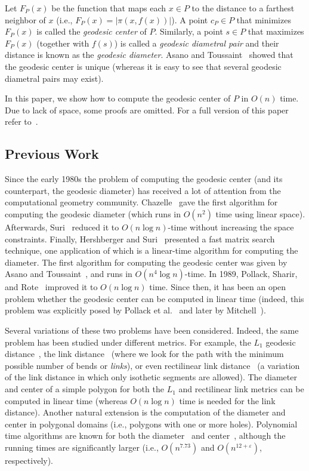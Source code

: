 \documentclass[a4paper,UKenglish]{lipics}
\newcommand{\F}[2]{\ensuremath{F_{\scriptscriptstyle #1}(#2)}}
\newcommand{\ff}[1]{\ensuremath{f(#1)}}
\newcommand{\cp}{\ensuremath{c_P}}
\newcommand{\g}[2]{\ensuremath{|\pi(#1, #2)|}}
\begin{document}
Let $\F{P}{x}$ be the function that maps each $x\in P$ to the distance to a farthest neighbor of $x$ (i.e., $\F{P}{x} = \g{x}{\ff{x}}$).
A point $\cp\in P$ that minimizes $\F{P}{x}$ is called the \emph{geodesic center} of $P$. Similarly, a point $s\in P$ that maximizes $\F{P}{x}$ (together with $\ff{s}$) is called a \emph{geodesic diametral pair} and their distance is known as the \emph{geodesic diameter}. Asano and Toussaint~\cite{at-cgcsp-85} showed that the geodesic center is unique (whereas it is easy to see that several geodesic diametral pairs may exist).

In this paper, we show how to compute the geodesic center of $P$ in $O(n)$ time. Due to lack of space, some proofs are omitted. For a full version of this paper refer to~\cite{ArXivGeodesicCenter}.

\subsection{Previous Work}
Since the early 1980s the problem of computing the geodesic center (and its counterpart, the geodesic diameter) has received a lot of attention from the computational geometry community. Chazelle~\cite{c-tpca-82} gave the first algorithm for computing the geodesic diameter (which runs in $O(n^2)$ time using linear space). Afterwards, Suri~\cite{suri1989computing} reduced it to $O(n\log n)$-time without increasing the space constraints. Finally, Hershberger and Suri~\cite{hershberger1993matrix} presented a fast matrix search technique, one application of which is a linear-time algorithm for computing the diameter.
The first algorithm for computing the geodesic center was given by Asano and Toussaint~\cite{at-cgcsp-85}, and runs in $O(n^4\log n)$-time. In 1989, Pollack, Sharir, and Rote~\cite{pollackComputingCenter} improved it to $O(n\log n)$ time. Since then, it has been an open problem whether the geodesic center can be
computed in linear time (indeed, this problem was explicitly posed by Pollack et al.~\cite{pollackComputingCenter} and later by Mitchell~\cite[Chapter 27]{m-gspno-00}).

Several variations of these two problems have been considered. Indeed, the same problem has been studied under different metrics. For example, the $L_1$ geodesic distance~\cite{bkow-clgdcsplt-13},  the link distance~\cite{dls-aclcsp-92,k-ealdp-89,suri-mlpprp-87} (where we look for the path with the minimum possible number of bends or {\em links}), or even rectilinear link distance~\cite{ns-crldp-91,ns-oarlcrp-96} (a variation of the link distance in which only isothetic segments are allowed). The diameter and center of a simple polygon for both the $L_1$ and rectilinear link metrics can be computed in linear time (whereas $O(n\log n)$ time is needed for the link distance).
Another natural extension is the computation of the diameter and center in polygonal domains (i.e., polygons with one or more holes). Polynomial time algorithms are known for both the diameter~\cite{bko-gdpd-13} and center~\cite{bko-cgcpd-14}, although the running times are significantly larger (i.e., $O(n^{7.73})$ and $O(n^{12+\varepsilon})$, respectively).
\end{document}
